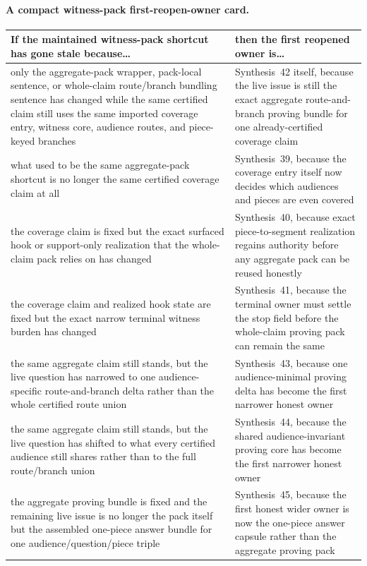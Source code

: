 \documentclass[11pt]{article}
\begin{document}
\paragraph{A compact witness-pack first-reopen-owner card.}
\begin{table}[t]
\centering
\small
\begin{tabularx}{\linewidth}{@{}LY@{}}
\toprule
If the maintained witness-pack shortcut has gone stale because\ldots & then the first reopened owner is\ldots \\
\midrule
only the aggregate-pack wrapper, pack-local sentence, or whole-claim route/branch bundling sentence has changed while the same certified claim still uses the same imported coverage entry, witness core, audience routes, and piece-keyed branches & Synthesis~42 itself, because the live issue is still the exact aggregate route-and-branch proving bundle for one already-certified coverage claim \\
what used to be the same aggregate-pack shortcut is no longer the same certified coverage claim at all & Synthesis~39, because the coverage entry itself now decides which audiences and pieces are even covered \\
the coverage claim is fixed but the exact surfaced hook or support-only realization that the whole-claim pack relies on has changed & Synthesis~40, because exact piece-to-segment realization regains authority before any aggregate pack can be reused honestly \\
the coverage claim and realized hook state are fixed but the exact narrow terminal witness burden has changed & Synthesis~41, because the terminal owner must settle the stop field before the whole-claim proving pack can remain the same \\
the same aggregate claim still stands, but the live question has narrowed to one audience-specific route-and-branch delta rather than the whole certified route union & Synthesis~43, because one audience-minimal proving delta has become the first narrower honest owner \\
the same aggregate claim still stands, but the live question has shifted to what every certified audience still shares rather than to the full route/branch union & Synthesis~44, because the shared audience-invariant proving core has become the first narrower honest owner \\
the aggregate proving bundle is fixed and the remaining live issue is no longer the pack itself but the assembled one-piece answer bundle for one audience/question/piece triple & Synthesis~45, because the first honest wider owner is now the one-piece answer capsule rather than the aggregate proving pack \\

\end{tabularx}
\end{table}
\end{document}
